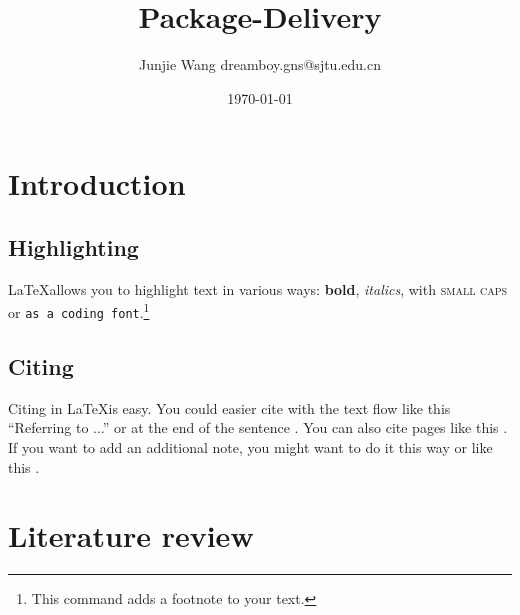 \documentclass[11pt, a4paper]{article} %
\title{Package-Delivery} %
\author{
Junjie Wang dreamboy.gns@sjtu.edu.cn %
  }
\date{\small \today} %
\begin{document}
%

\maketitle %



\setcounter{page}{1} %

\section{Introduction} %
\subsection{Highlighting} %
\LaTeX allows you to highlight text in various ways: \textbf{bold}, \textit{italics}, with \textsc{small caps} or \texttt{as a coding font}.\footnote{ This command adds a footnote to your text.} 

\subsection{Citing} %
Citing in \LaTeX is easy. You could easier cite with the text flow like this ``Referring to \citet{collier2004greed} ...''  or at the end of the sentence \cite{collier2004greed}. You can also cite pages like this \citep[55]{collier2004greed}. If you want to add an additional note, you might want to do it this way \citep[cp.][22]{collier2004greed} or like this \citep[cp.][]{collier2004greed}.\\
\blindtext %


\section{Literature review}
\end{document}
